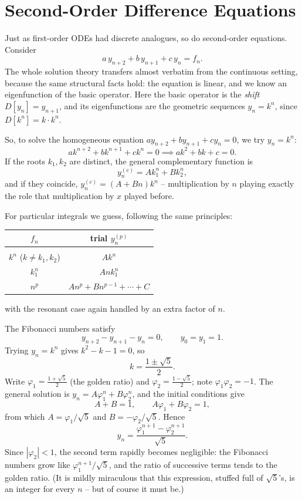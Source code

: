 \documentclass[a4paper]{scrartcl}
\begin{document}
\section{Second-Order Difference Equations}

Just as first-order ODEs had discrete analogues, so do second-order equations. Consider
$$
a\, y_{n + 2} + b \, y_{n + 1} + c\, y_n = f_n.
$$
The whole solution theory transfers almost verbatim from the continuous setting, because the same structural facts hold: the equation is linear, and we know an eigenfunction of the basic operator. Here the basic operator is the \emph{shift} $D[y_n] = y_{n + 1}$, and its eigenfunctions are the geometric sequences $y_n = k^n$, since $D[k^n] = k \cdot k^n$.

So, to solve the homogeneous equation $a y_{n+2} + by_{n+1} + cy_n = 0$, we try $y_n = k^n$:
$$
a k^{n + 2} + b k^{n+1} + c k^n = 0 \implies ak^2 + bk + c = 0.
$$
If the roots $k_1, k_2$ are distinct, the general complementary function is
$$
y_n^{(c)} = A k_1^n + B k_2^n,
$$
and if they coincide, $y_n^{(c)} = (A + Bn)k^n$ -- multiplication by $n$ playing exactly the role that multiplication by $x$ played before.

For particular integrals we guess, following the same principles:
\begin{center}
	\begin{tabular}{cc}
		$f_n$ & trial $y_n^{(p)}$ \\[2pt]
		\hline \\[-8pt]
		$k^n$ ($k \neq k_1, k_2$) & $A k^n$ \\
		$k_1^n$ & $A n k_1^n$ \\
		$n^p$ & $A n^p + B n^{p - 1} + \cdots + C$
	\end{tabular}
\end{center}
with the resonant case again handled by an extra factor of $n$.

\begin{example}
	The Fibonacci numbers satisfy
	$$
	y_{n + 2} - y_{n + 1} - y_n = 0, \qquad y_0 = y_1 = 1.
	$$
	Trying $y_n = k^n$ gives $k^2 - k - 1 = 0$, so
	$$
	k = \frac{1 \pm \sqrt 5}{2}.
	$$
	Write $\varphi_1 = \frac{1 + \sqrt 5}{2}$ (the golden ratio) and $\varphi_2 = \frac{1 - \sqrt{5}}{2}$; note $\varphi_1 \varphi_2 = -1$. The general solution is $y_n = A \varphi_1^n + B\varphi_2^n$, and the initial conditions give
	$$
	A + B = 1, \qquad A \varphi_1 + B \varphi_2 = 1,
	$$
	from which $A = \varphi_1/\sqrt 5$ and $B = -\varphi_2/\sqrt{5}$. Hence
	$$
	y_n = \frac{\varphi_1^{n + 1} - \varphi_2^{n + 1}}{\sqrt 5}.
	$$
	Since $|\varphi_2| < 1$, the second term rapidly becomes negligible: the Fibonacci numbers grow like $\varphi_1^{n+1}/\sqrt 5$, and the ratio of successive terms tends to the golden ratio. (It is mildly miraculous that this expression, stuffed full of $\sqrt 5$'s, is an integer for every $n$ -- but of course it must be.)
\end{example}
\end{document}
